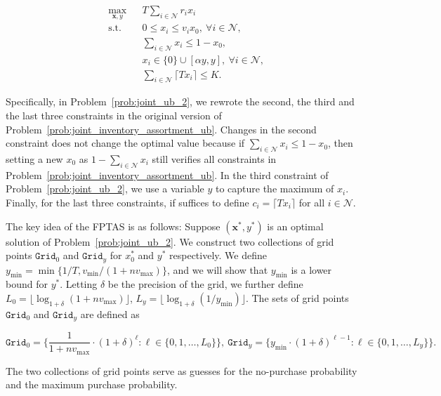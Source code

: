 \documentclass[mnsc,non-blindrev]{informs3}
\theoremstyle{definition}
\begin{document}
\begin{appendices}{\Large{}}
{\begin{equation}
\label{prob:joint_ub_2}
\begin{aligned}
&\max_{\bm{x},y}&&T\sum_{i\in\mathcal{N}}r_ix_i\\
&\text{s.t.}&&0\leq x_i\leq v_ix_0,\ \forall i\in\mathcal{N},\\
&&&\sum_{i\in\mathcal{N}}x_i\leq 1-x_0,\\
&&&x_i\in \{0\}\cup [\alpha y,y],\ \forall i\in\mathcal{N},\\
&&&\sum_{i\in\mathcal{N}}\lceil Tx_i\rceil\leq K.
\end{aligned}
\end{equation}

Specifically, in Problem~\eqref{prob:joint_ub_2}, we rewrote the second, the third and the last three constraints in the original version of Problem~\eqref{prob:joint_inventory_assortment_ub}. Changes in the second constraint does not change the optimal value because if $\sum_{i\in\mathcal{N}}x_i\leq 1-x_0$, then setting a new $x_0$ as $1-\sum_{i\in\mathcal{N}}x_i$ still verifies all constraints in Problem~\eqref{prob:joint_inventory_assortment_ub}. In the third constraint of Problem~\eqref{prob:joint_ub_2}, we use a variable $y$ to capture the maximum of $x_i$. Finally, for the last three constraints, if suffices to define $c_i=\lceil Tx_i\rceil$ for all $i\in\mathcal{N}$.

The key idea of the FPTAS is as follows: Suppose $(\bm{x}^*,y^*)$ is an optimal solution of Problem~\eqref{prob:joint_ub_2}. We construct two collections of grid points $\texttt{Grid}_0$ and $\texttt{Grid}_y$ for $x_0^*$ and $y^*$ respectively. We define $y_{\min}=\min\{1/T,v_{\min}/(1+nv_{\max})\}$, and we will show that $y_{\min}$ is a lower bound for $y^*$. Letting $\delta$ be the precision of the grid, we further define $L_0=\lfloor\log_{1+\delta}(1+nv_{\max})\rfloor$, $L_y=\lfloor\log_{1+\delta}(1/y_{\min})\rfloor$. The sets of grid points $\texttt{Grid}_0$ and $\texttt{Grid}_y$ are defined as

\begin{equation*}
\texttt{Grid}_0=\Big\{\dfrac{1}{1+nv_{\max}}\cdot (1+\delta)^\ell:\ell\in\{0,1,\dots,L_0\}\Big\},\ \texttt{Grid}_y=\Big\{y_{\min}\cdot (1+\delta)^{\ell-1}:\ell\in\{0,1,\dots,L_y\}\Big\}.
\end{equation*}

The two collections of grid points serve as guesses for the no-purchase probability and the maximum purchase probability.

}
\end{appendices}
\end{document}
